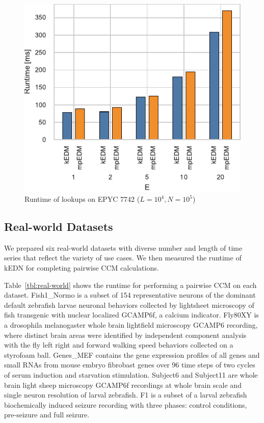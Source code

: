 \documentclass[sigconf]{acmart}
\begin{document}
\begin{figure}
    \centering
    \includegraphics[width=.80\linewidth]{figs/runtime_lookup_epyc}
    \caption{Runtime of lookups on EPYC 7742 ($L=10^4, N=10^5$)}%
    \label{fig:breakdown-lookup-epyc}
\end{figure}

\subsection{Real-world Datasets}

We prepared six real-world datasets with diverse number and length of time
series that reflect the variety of use cases. We then measured the runtime of kEDN for completing pairwise CCM calculations.

Table~\ref{tbl:real-world} shows the runtime for performing a pairwise CCM on
each dataset.
Fish1\_Normo is a subset of 154 representative neurons of the dominant default zebrafish larvae neuronal behaviors collected by lightsheet microscopy of fish transgenic with nuclear localized GCAMP6f, a calcium indicator. Fly80XY is a drosophila melanogaster whole brain lightfield microscopy GCAMP6 recording, where distinct brain areas were identified by independent component analysis with the fly left right and forward walking speed behaviors collected on a styrofoam ball. Genes\_MEF contains the gene expression profiles of all genes and small RNAs from mouse embryo fibrobast genes over 96 time steps of two cycles of serum induction and starvation stimulation. Subject6 and Subject11 are whole brain light sheep microscopy GCAMP6f recordings at whole brain scale and single neuron resolution of larval zebrafish. F1 is a subset of a larval zebrafish biochemically induced seizure recording with three phases: control conditions, pre-seizure and full seizure.
\end{document}
